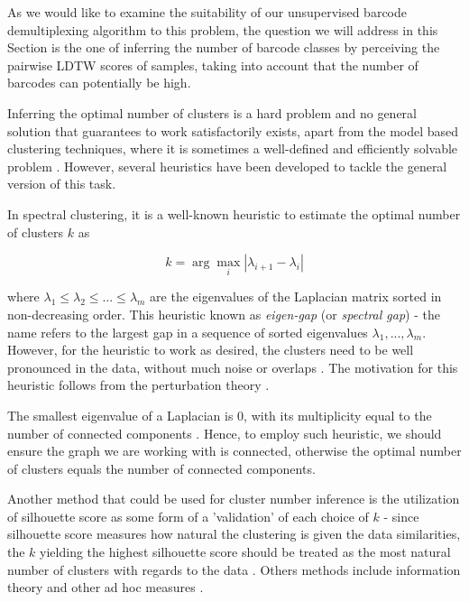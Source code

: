 As we would like to examine the suitability of our unsupervised barcode demultiplexing algorithm to this problem, the question we will address in this Section is the one of inferring the number of barcode classes by perceiving the pairwise LDTW scores of samples, taking into account that the number of barcodes can potentially be high.

Inferring the optimal number of clusters is a hard problem and no general solution that guarantees to work satisfactorily exists, apart from the model based clustering techniques, where it is sometimes a well-defined and efficiently solvable problem \cite{von2007tutorial}. However, several heuristics have been developed to tackle the general version of this task.

In spectral clustering, it is a well-known heuristic to estimate the optimal number of clusters $k$ as

\begin{equation}
    k = \arg \max_{i} |\lambda_{i+1} - \lambda_{i}|
\end{equation}

where $\lambda_1 \leq \lambda_2 \leq ... \leq \lambda_{m}$ are the eigenvalues of the Laplacian matrix sorted in non-decreasing order. This heuristic known as \textit{eigen-gap} (or \textit{spectral gap}) - the name refers to the largest gap in a sequence of sorted eigenvalues $\lambda_1, ..., \lambda_m$. However, for the heuristic to work as desired, the clusters need to be well pronounced in the data, without much noise or overlaps \cite{von2007tutorial}. The motivation for this heuristic follows from the perturbation theory \cite{von2007tutorial}. 

The smallest eigenvalue of a Laplacian is $0$, with its multiplicity equal to the number of connected components \cite{von2007tutorial}. Hence, to employ such heuristic, we should ensure the graph we are working with is connected, otherwise the optimal number of clusters equals the number of connected components. 

Another method that could be used for cluster number inference is the utilization of silhouette score as some form of a 'validation' of each choice of $k$ - since silhouette score measures how natural the clustering is given the data similarities, the $k$ yielding the highest silhouette score should be treated as the most natural number of clusters with regards to the data \cite{silhouette1987}. Others methods include information theory and other ad hoc measures \cite{von2007tutorial}.

